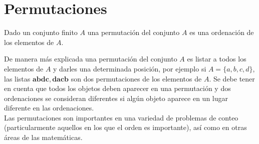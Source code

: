 \section{Permutaciones}

\begin{definicion}
Dado un conjunto finito $A$ una permutación del conjunto $A$ es una ordenación de los elementos de $A$. 
\end{definicion}

De manera más explicada una permutación del conjunto $A$ es listar a todos los elementos de $A$ y darles una determinada posición, por ejemplo si $A=\{a, b ,c ,d\}$, las listas $\mathbf{abdc, dacb}$ son dos permutaciones de los elementos de $A$. 
Se debe tener en cuenta que todos los objetos deben aparecer en una permutación y dos ordenaciones se consideran diferentes si algún objeto aparece en un lugar diferente en las ordenaciones.\\

Las permutaciones son importantes en una variedad de problemas de conteo (particularmente aquellos en los que el orden es importante), así como en otras áreas de las matemáticas.\\

